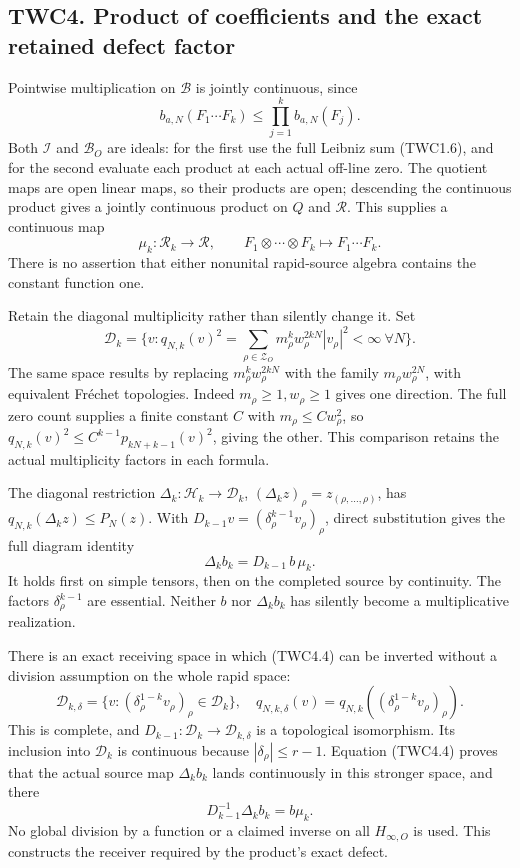 \subsection{TWC4. Product of coefficients and the exact retained defect
factor}\label{twc4.-product-of-coefficients-and-the-exact-retained-defect-factor}

Pointwise multiplication on \(\mathcal B\) is jointly continuous, since
\[
b_{a,N}(F_1\cdots F_k)\le\prod_{j=1}^k b_{a,N}(F_j).
\tag{TWC4.1}
\] Both \(\mathcal I\) and \(\mathcal B_O\) are ideals: for the first
use the full Leibniz sum (TWC1.6), and for the second evaluate each
product at each actual off-line zero. The quotient maps are open linear
maps, so their products are open; descending the continuous product
gives a jointly continuous product on \(Q\) and \(\mathcal R\). This
supplies a continuous map \[
\mu_k:\mathscr R_k\to\mathcal R,\qquad
F_1\otimes\cdots\otimes F_k\mapsto F_1\cdots F_k.
\tag{TWC4.2}
\] There is no assertion that either nonunital rapid-source algebra
contains the constant function one.

Retain the diagonal multiplicity rather than silently change it. Set \[
\mathscr D_k=\{v:q_{N,k}(v)^2=\sum_{\rho\in\mathscr Z_O}
m_\rho^k w_\rho^{2kN}|v_\rho|^2<\infty\ \forall N\}.
\tag{TWC4.3}
\] The same space results by replacing \(m_\rho^kw_\rho^{2kN}\) with the
family \(m_\rho w_\rho^{2N}\), with equivalent Fréchet topologies.
Indeed \(m_\rho\ge1,w_\rho\ge1\) gives one direction. The full zero
count supplies a finite constant \(C\) with \(m_\rho\le Cw_\rho^2\), so
\(q_{N,k}(v)^2\le C^{k-1}p_{kN+k-1}(v)^2\), giving the other. This
comparison retains the actual multiplicity factors in each formula.

The diagonal restriction \(\Delta_k:\mathscr H_k\to\mathscr D_k\),
\((\Delta_kz)_\rho=z_{(\rho,\ldots,\rho)}\), has
\(q_{N,k}(\Delta_kz)\le P_N(z)\). With
\(D_{k-1}v=(\delta_\rho^{k-1}v_\rho)_\rho\), direct substitution gives
the full diagram identity \[
\boxed{\quad\Delta_k b_k=D_{k-1}\,b\,\mu_k.\quad}
\tag{TWC4.4}
\] It holds first on simple tensors, then on the completed source by
continuity. The factors \(\delta_\rho^{k-1}\) are essential. Neither
\(b\) nor \(\Delta_kb_k\) has silently become a multiplicative
realization.

There is an exact receiving space in which (TWC4.4) can be inverted
without a division assumption on the whole rapid space: \[
\mathscr D_{k,\delta}=\{v:(\delta_\rho^{1-k}v_\rho)_\rho\in\mathscr D_k\},\quad
q_{N,k,\delta}(v)=q_{N,k}((\delta_\rho^{1-k}v_\rho)_\rho).
\tag{TWC4.5}
\] This is complete, and
\(D_{k-1}:\mathscr D_k\to\mathscr D_{k,\delta}\) is a topological
isomorphism. Its inclusion into \(\mathscr D_k\) is continuous because
\(|\delta_\rho|\le r-1\). Equation (TWC4.4) proves that the actual
source map \(\Delta_kb_k\) lands continuously in this stronger space,
and there \[
D_{k-1}^{-1}\Delta_kb_k=b\mu_k.
\tag{TWC4.6}
\] No global division by a function or a claimed inverse on all
\(H_{\infty,O}\) is used. This constructs the receiver required by the
product's exact defect.

